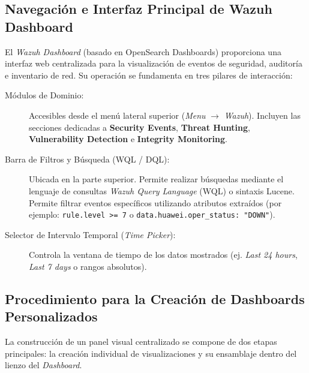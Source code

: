 \subsection{Navegación e Interfaz Principal de Wazuh Dashboard}
El \textit{Wazuh Dashboard} (basado en OpenSearch Dashboards) proporciona una interfaz web centralizada para la visualización de eventos de seguridad, auditoría e inventario de red. Su operación se fundamenta en tres pilares de interacción:

\begin{description}
    \item[Módulos de Dominio:] Accesibles desde el menú lateral superior (\textit{Menu} $\rightarrow$ \textit{Wazuh}). Incluyen las secciones dedicadas a \textbf{Security Events}, \textbf{Threat Hunting}, \textbf{Vulnerability Detection} e \textbf{Integrity Monitoring}.
    
    \item[Barra de Filtros y Búsqueda (WQL / DQL):] Ubicada en la parte superior. Permite realizar búsquedas mediante el lenguaje de consultas \textit{Wazuh Query Language} (WQL) o sintaxis Lucene. Permite filtrar eventos específicos utilizando atributos extraídos (por ejemplo: \texttt{rule.level >= 7} o \texttt{data.huawei.oper\_status: "DOWN"}).
    
    \item[Selector de Intervalo Temporal (\textit{Time Picker}):] Controla la ventana de tiempo de los datos mostrados (ej. \textit{Last 24 hours}, \textit{Last 7 days} o rangos absolutos).
\end{description}

\subsection{Procedimiento para la Creación de Dashboards Personalizados}

La construcción de un panel visual centralizado se compone de dos etapas principales: la creación individual de visualizaciones y su ensamblaje dentro del lienzo del \textit{Dashboard}.

